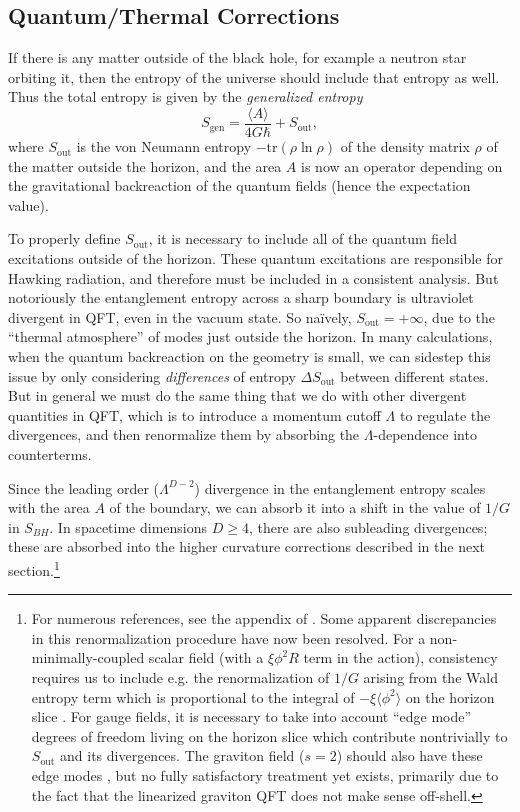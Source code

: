 \documentclass[12pt,a4paper]{article}
\def\be{\begin{equation}}
\def\ee{\end{equation}}
\begin{document}
\subsection{Quantum/Thermal Corrections} \label{sec:quantumentropy}
If there is any matter outside of the black hole, for example a neutron star orbiting it, then the entropy of the universe should include that entropy as well. Thus the total entropy is given by the \textit{generalized entropy}
\be\label{genS}
S_{\text{gen}} = \frac{\langle A \rangle}{4G \hbar} + S_{\text{out}},
\ee
where $S_{\text{out}}$ is the von Neumann entropy $-\mathrm{tr}\left(\rho \ln \rho \right)$ of the density matrix $\rho$ of the matter outside the horizon, and the area $A$ is now an operator depending on the gravitational backreaction of the quantum fields (hence the expectation value).

To properly define $S_{\text{out}}$, it is necessary to include all of the quantum field excitations outside of the horizon. These quantum excitations are responsible for Hawking radiation, and therefore must be included in a consistent analysis. But notoriously the entanglement entropy across a sharp boundary is ultraviolet divergent in QFT, even in the vacuum state. So na\"{i}vely, $S_{\text{out}} = + \infty$, due to the ``thermal atmosphere'' of modes just outside the horizon. In many calculations, when the quantum backreaction on the geometry is small, we can sidestep this issue by only considering \emph{differences} of entropy $\Delta S_{\text{out}}$ between different states. But in general we must do the same thing that we do with other divergent quantities in QFT, which is to introduce a momentum cutoff $\Lambda$ to regulate the divergences, and then renormalize them by absorbing the $\Lambda$-dependence into counterterms.

Since the leading order ($\Lambda^{D-2}$) divergence in the entanglement entropy scales with the area $A$ of the boundary, we can absorb it into a shift in the value of $1/G$ in $S_{BH}$. In spacetime dimensions $D \geq 4$, there are also subleading divergences; these are absorbed into the higher curvature corrections described in the next section.\footnote{For numerous references, see the appendix of \cite{bousso2016quantum}.  Some apparent discrepancies in this renormalization procedure have now been resolved.  For a non-minimally-coupled scalar field (with a $\xi \phi^2 R$ term in the action), consistency requires us to include e.g. the renormalization of $1/G$ arising from the Wald entropy term which is proportional to the integral of $-\xi \langle \phi^2 \rangle$ on the horizon slice \cite{ford2001classical}.  For gauge fields, it is necessary to take into account ``edge mode'' degrees of freedom living on the horizon slice \cite{casini2014remarks,donnelly2014entanglement,donnelly2015entanglement,donnelly2016geometric,jafferis2016relative} which contribute nontrivially to $S_\mathrm{out}$ and its divergences.  The graviton field ($s = 2$) should also have these edge modes \cite{jafferis2016relative}, but no fully satisfactory treatment yet exists, primarily due to the fact that the linearized graviton QFT does not make sense off-shell.}
\end{document}
